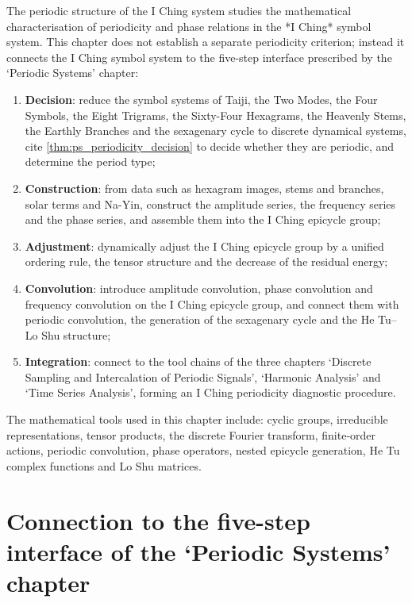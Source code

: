 \begin{remark}\label{rem:yijing_five_steps_positioning}
The periodic structure of the I Ching system studies the mathematical characterisation of periodicity and phase relations in the *I Ching* symbol system. This chapter does not establish a separate periodicity criterion; instead it connects the I Ching symbol system to the five-step interface prescribed by the `Periodic Systems' chapter:
\begin{enumerate}[label=(\arabic*)]
    \item \textbf{Decision}: reduce the symbol systems of Taiji, the Two Modes, the Four Symbols, the Eight Trigrams, the Sixty-Four Hexagrams, the Heavenly Stems, the Earthly Branches and the sexagenary cycle to discrete dynamical systems, cite \cref{thm:ps_periodicity_decision} to decide whether they are periodic, and determine the period type;
    \item \textbf{Construction}: from data such as hexagram images, stems and branches, solar terms and Na-Yin, construct the amplitude series, the frequency series and the phase series, and assemble them into the I Ching epicycle group;
    \item \textbf{Adjustment}: dynamically adjust the I Ching epicycle group by a unified ordering rule, the tensor structure and the decrease of the residual energy;
    \item \textbf{Convolution}: introduce amplitude convolution, phase convolution and frequency convolution on the I Ching epicycle group, and connect them with periodic convolution, the generation of the sexagenary cycle and the He Tu--Lo Shu structure;
    \item \textbf{Integration}: connect to the tool chains of the three chapters `Discrete Sampling and Intercalation of Periodic Signals', `Harmonic Analysis' and `Time Series Analysis', forming an I Ching periodicity diagnostic procedure.
\end{enumerate}
The mathematical tools used in this chapter include: cyclic groups, irreducible representations, tensor products, the discrete Fourier transform, finite-order actions, periodic convolution, phase operators, nested epicycle generation, He Tu complex functions and Lo Shu matrices.
\end{remark}

\section{Connection to the five-step interface of the `Periodic Systems' chapter}
\label{sec:yijing_five_steps}

